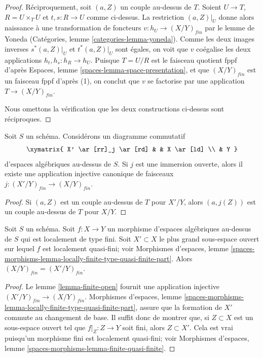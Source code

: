 \begin{proof}
\medskip\noindent
Réciproquement, soit $(a, Z)$ un couple au-dessus de $T$.
Soient $U \to T$, $R = U \times_T U$ et $t, s : R \to U$ comme
ci-dessus. La restriction $(a, Z)|_U$ donne alors naissance à une
transformation de foncteurs $v : h_U \to (X/Y)_{fin}$ par le
lemme de Yoneda
(Catégories, lemme \ref{categories-lemma-yoneda}).
Comme les deux images inverses $s^*(a, Z)|_U$ et $t^*(a, Z)|_U$
sont égales, on voit que $v$ coégalise les deux applications
$h_t, h_s : h_R \to h_U$. Puisque $T = U/R$ est le faisceau quotient fppf d'après
Espaces, lemme \ref{spaces-lemma-space-presentation},
et que $(X/Y)_{fin}$ est un faisceau fppf d'après (1), on conclut
que $v$ se factorise par une application $T \to (X/Y)_{fin}$.

\medskip\noindent
Nous omettons la vérification que les deux constructions ci-dessus sont
réciproques.
\end{proof}

\begin{lemma}
\label{lemma-finite-open}
Soit $S$ un schéma. Considérons un diagramme commutatif
$$
\xymatrix{
X' \ar[rr]_j \ar[rd] & & X \ar[ld] \\
& Y
}
$$
d'espaces algébriques au-dessus de $S$. Si $j$ est une immersion ouverte, alors
il existe une application injective canonique de faisceaux
$j : (X'/Y)_{fin} \to (X/Y)_{fin}$.
\end{lemma}

\begin{proof}
Si $(a, Z)$ est un couple au-dessus de $T$ pour $X'/Y$, alors
$(a, j(Z))$ est un couple au-dessus de $T$ pour $X/Y$.
\end{proof}

\begin{lemma}
\label{lemma-finite-lives-on-locally-quasi-finite-part}
Soit $S$ un schéma.
Soit $f : X \to Y$ un morphisme d'espaces algébriques au-dessus de $S$ qui est
localement de type fini.
Soit $X' \subset X$ le plus grand sous-espace ouvert sur lequel $f$ est
localement quasi-fini; voir
Morphismes d'espaces,
lemme \ref{spaces-morphisms-lemma-locally-finite-type-quasi-finite-part}.
Alors $(X/Y)_{fin} = (X'/Y)_{fin}$.
\end{lemma}

\begin{proof}
Le lemme \ref{lemma-finite-open}
fournit une application injective $(X'/Y)_{fin} \to (X/Y)_{fin}$.
Morphismes d'espaces,
lemme \ref{spaces-morphisms-lemma-locally-finite-type-quasi-finite-part},
assure que la formation de $X'$ commute au changement de base.
Il suffit donc de montrer que, si
$Z \subset X$ est un sous-espace ouvert tel que $f|_Z : Z \to Y$ soit fini,
alors $Z \subset X'$. Cela est vrai puisqu'un morphisme fini
est localement quasi-fini; voir
Morphismes d'espaces, lemme \ref{spaces-morphisms-lemma-finite-quasi-finite}.
\end{proof}

